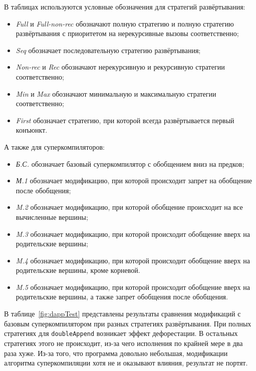 В таблицах используются условные обозначения для стратегий развёртывания:
\begin{itemize}
\item {\it Full} и {\it Full-non-rec} обозначают полную стратегию и полную стратегию развёртывания с приоритетом на нерекурсивные вызовы соответственно;
\item {\it Seq} обозначает последовательную стратегию развёртывания;
\item {\it Non-rec} и {\it Rec} обозначают нерекурсивную и рекурсивную стратегии соответственно;
\item {\it Min} и {\it Max} обозначают минимальную и максимальную стратегии соответственно;
\item {\it First} обозначает стратегию, при которой всегда развёртывается первый конъюнкт.
\end{itemize}

А также для суперкомпиляторов:
\begin{itemize}
\item {\it Б.С.} обозначает базовый суперкомпилятор с обобщением вниз на предков;
\item {\it М.1 } обозначает модификацию, при которой происходит запрет на обобщение после обобщения;
\item {\it M.2 } обозначает модификацию, при которой обобщение происходит на все вычисленные вершины;
\item {\it M.3 } обозначает модификацию, при которой происходит обобщение вверх на родительские вершины;
\item {\it M.4 } обозначает модификацию, при которой происходит обобщение вверх на родительские вершины, кроме корневой.
\item {\it M.5 } обозначает модификацию, при которой происходит обобщение вверх на родительские вершины, а также запрет обобщения после обобщения.
\end{itemize}


В таблице~\ref{fig:dappTest} представлены результаты сравнения модификаций
с базовым суперкомпилятором при разных стратегиях развёртывания.
При полных стратегиях для \lstinline{doubleAppend} возникает эффект дефорестации.
В остальных стратегиях этого не происходит, из-за чего исполнения по
крайней мере в два раза хуже. Из-за того, что программа довольно небольшая,
модификации алгоритма суперкомпиляции хотя не и оказывают влияния, результат не портят.

